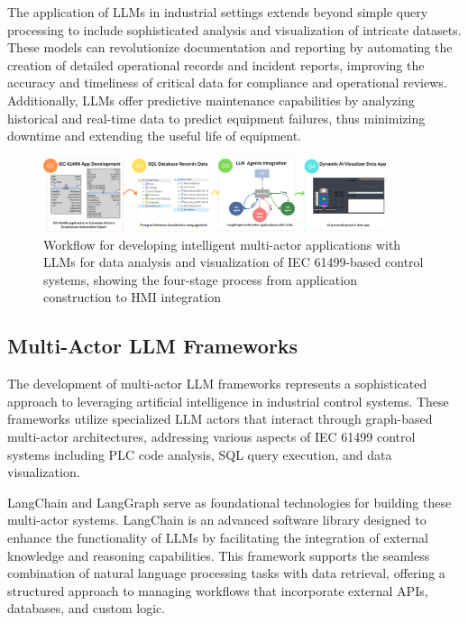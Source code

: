 The application of LLMs in industrial settings extends beyond simple query processing to include sophisticated analysis and visualization of intricate datasets. These models can revolutionize documentation and reporting by automating the creation of detailed operational records and incident reports, improving the accuracy and timeliness of critical data for compliance and operational reviews. Additionally, LLMs offer predictive maintenance capabilities by analyzing historical and real-time data to predict equipment failures, thus minimizing downtime and extending the useful life of equipment.

\begin{figure}[h]
    \centering
    \includegraphics[width=0.9\textwidth]{MX_Papers/Paper12/images/workflow.PNG}
    \caption{Workflow for developing intelligent multi-actor applications with LLMs for data analysis and visualization of IEC 61499-based control systems, showing the four-stage process from application construction to HMI integration}
    \label{fig:llm_workflow}
\end{figure}

\subsection{Multi-Actor LLM Frameworks}

The development of multi-actor LLM frameworks represents a sophisticated approach to leveraging artificial intelligence in industrial control systems. These frameworks utilize specialized LLM actors that interact through graph-based multi-actor architectures, addressing various aspects of IEC 61499 control systems including PLC code analysis, SQL query execution, and data visualization.

LangChain and LangGraph serve as foundational technologies for building these multi-actor systems. LangChain is an advanced software library designed to enhance the functionality of LLMs by facilitating the integration of external knowledge and reasoning capabilities. This framework supports the seamless combination of natural language processing tasks with data retrieval, offering a structured approach to managing workflows that incorporate external APIs, databases, and custom logic.

